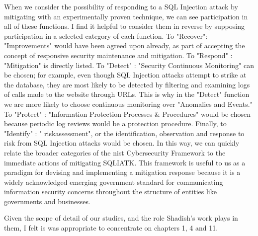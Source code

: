 When we consider the possibility of responding to a SQL Injection \gls{attack} by mitigating with an experimentally proven technique, we can see participation in all of these functions.  I find it helpful to consider them in reverse by supposing participation in a selected category of each function.  To "Recover": "Improvements" would have been agreed upon already, as part of accepting the concept of responsive security maintenance and mitigation.  To "Respond" : "Mitigation" is directly listed.  To "Detect" : "Security Continuous Monitoring" can be chosen; for example, even though SQL Injection attacks attempt to strike at the database, they are most likely to be detected by filtering and examining logs of calls made to the website through URLs.  This is why in the "Detect" function we are more likely to choose continuous monitoring over "Anomalies and Events."  To "Protect" : "Information Protection Processes \& Procedures" would be chosen because periodic log reviews would be a protection procedure.  Finally, to "Identify" : " \gls{riskassessment}", or the identification, observation and response to risk from SQL Injection attacks would be chosen.  In this way, we can quickly relate the broader categories of the  \gls{nist} Cybersecurity Framework to the immediate actions of mitigating SQLIATK.  This framework is useful to us as a paradigm for devising and implementing a mitigation response because it is a widely acknowledged emerging government standard for communicating information security concerns throughout the structure of entities like governments and businesses.



Given the scope of detail of our studies, and the role Shadish's work plays in them, I felt is was appropriate to concentrate on chapters 1, 4 and 11.

